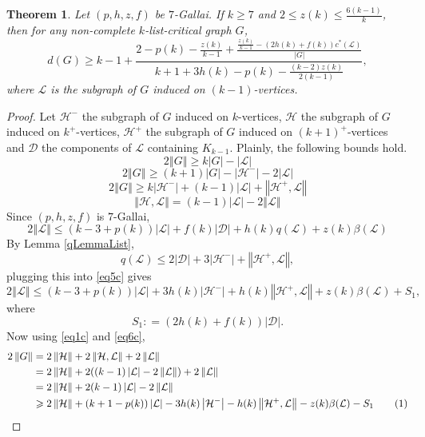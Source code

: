 \documentclass[10pt]{article}
\theoremstyle{plain}
\newtheorem{thm}{Theorem}[section]
\theoremstyle{definition}
\theoremstyle{remark}
\newcommand{\fancy}[1]{\mathcal{#1}}
\newcommand{\D}{\fancy{D}}
\renewcommand{\L}{\fancy{L}}
\newcommand{\HH}{\fancy{H}}
\newcommand{\card}[1]{\left|#1\right|}
\newcommand{\size}[1]{\left\Vert#1\right\Vert}
\newcommand{\parens}[1]{\left( #1 \right)}
\newcommand{\DefinedAs}{\mathrel{\mathop:}=}
\def\D{\fancy{D}}
\newcommand\numberthis{\addtocounter{equation}{1}\tag{\theequation}}
\begin{document}
\begin{thm}\label{k7}
	Let $\parens{p,h,z,f}$ be $7$-Gallai.  If $k \ge 7$ and $2 \le z(k) \le \frac{6(k-1)}{k}$, then for any non-complete $k$-list-critical graph $G$,
	\[d(G) \ge k-1 + \frac{2 - p(k) - \frac{z(k)}{k-1} + \frac{\frac{z(k)}{k-1} - (2h(k) + f(k))c^*(\L)}{\card{G}}}{k+1 + 3h(k) - p(k) - \frac{(k-2)z(k)}{2(k-1)}},\]
	where $\L$ is the subgraph of $G$ induced on $(k-1)$-vertices.
\end{thm}
\begin{proof}
Let $\HH^-$ the subgraph of $G$ induced on $k$-vertices, $\HH$ the subgraph of $G$ induced on $k^+$-vertices, 
$\HH^+$ the subgraph of $G$ induced on $(k+1)^+$-vertices and $\D$ the components of $\L$ containing $K_{k-1}$.
Plainly, the following bounds hold.
\begin{equation}\label{eq1c}
2\size{G} \ge k\card{G} - \card{\L}
\end{equation}
\begin{equation}\label{eq2c}
2\size{G} \ge (k+1)\card{G} - \card{\HH^-} - 2\card{\L}
\end{equation}
\begin{equation}\label{eq3c}
2\size{G} \ge k\card{\HH^-} + (k-1)\card{\L} + \size{\HH^+, \L}
\end{equation}
\begin{equation}\label{eq4c}
\size{\HH,\L} = (k-1)\card{\L} - 2\size{\L}
\end{equation}
Since $\parens{p,h,z,f}$ is $7$-Gallai,
\begin{equation}\label{eq5c}
2\size{\L} \le \parens{k-3 + p(k)}\card{\L} + f(k)\card{\D} + h(k)q(\L) + z(k)\beta(\L)
\end{equation}
By Lemma \ref{qLemmaList},
\[q(\L) \le 2\card{\D} + 3\card{\HH^-} + \size{\HH^+, \L},\]
plugging this into \eqref{eq5c} gives
\begin{equation}\label{eq6c}
2\size{\L} \le \parens{k-3 + p(k)}\card{\L} + 3h(k)\card{\HH^-} + h(k)\size{\HH^+, \L} + z(k)\beta(\L) + S_1,
\end{equation}
where
\[S_1 \DefinedAs (2h(k) + f(k))\card{\D}.\]
Now using \eqref{eq1c} and \eqref{eq6c},
\begin{align*}
	2\size{G} &= 2\size{\HH} + 2\size{\HH, \L} + 2\size{\L}\\
	&= 2\size{\HH} + 2((k-1)\card{\L} - 2\size{\L}) + 2\size{\L}\\
	&= 2\size{\HH} + 2(k-1)\card{\L} - 2\size{\L}\\
	&\ge 2\size{\HH} + \parens{k+1 - p(k)}\card{\L} - 3h(k)\card{\HH^-} - h(k)\size{\HH^+, \L} - z(k)\beta(\L) - S_1\numberthis \label{eq7c}\\

\end{align*}
\end{proof}
\end{document}
